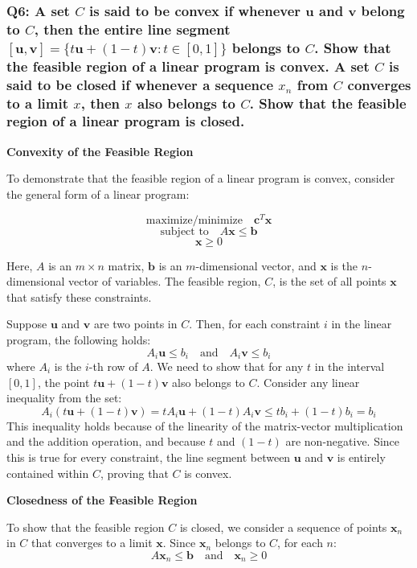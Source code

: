 \documentclass[8pt]{article}
\begin{document}
\subsubsection*{Q6: A set \(C\) is said to be convex if whenever \(\mathbf{u}\) and \(\mathbf{v}\) belong to \(C\), then the entire line segment \([\mathbf{u}, \mathbf{v}] = \{t \mathbf{u} + (1 - t) \mathbf{v} : t \in [0, 1]\}\) belongs to \(C\). Show that the feasible region of a linear program is convex. A set \(C\) is said to be closed if whenever a sequence \(x_n\) from \(C\) converges to a limit \(x\), then \(x\) also belongs to \(C\). Show that the feasible region of a linear program is closed.}

\textbf{Convexity of the Feasible Region}

To demonstrate that the feasible region of a linear program is convex, consider the general form of a linear program:

\[
\text{maximize/minimize} \quad \mathbf{c}^T \mathbf{x}
\]
\[
\text{subject to} \quad A\mathbf{x} \leq \mathbf{b}
\]
\[
\mathbf{x} \geq 0
\]

Here, \( A \) is an \( m \times n \) matrix, \( \mathbf{b} \) is an \( m \)-dimensional vector, and \( \mathbf{x} \) is the \( n \)-dimensional vector of variables. The feasible region, \( C \), is the set of all points \( \mathbf{x} \) that satisfy these constraints.

Suppose \( \mathbf{u} \) and \( \mathbf{v} \) are two points in \( C \). Then, for each constraint \( i \) in the linear program, the following holds:
\[
A_i \mathbf{u} \leq b_i \quad \text{and} \quad A_i \mathbf{v} \leq b_i
\]
where \( A_i \) is the \( i \)-th row of \( A \). We need to show that for any \( t \) in the interval \([0, 1]\), the point \( t \mathbf{u} + (1 - t) \mathbf{v} \) also belongs to \( C \). Consider any linear inequality from the set:
\[
A_i (t \mathbf{u} + (1 - t) \mathbf{v}) = t A_i \mathbf{u} + (1 - t) A_i \mathbf{v} \leq t b_i + (1 - t) b_i = b_i
\]
This inequality holds because of the linearity of the matrix-vector multiplication and the addition operation, and because \( t \) and \( (1 - t) \) are non-negative. Since this is true for every constraint, the line segment between \( \mathbf{u} \) and \( \mathbf{v} \) is entirely contained within \( C \), proving that \( C \) is convex.

\textbf{Closedness of the Feasible Region}

To show that the feasible region \( C \) is closed, we consider a sequence of points \( \mathbf{x}_n \) in \( C \) that converges to a limit \( \mathbf{x} \). Since \( \mathbf{x}_n \) belongs to \( C \), for each \( n \):
\[
A \mathbf{x}_n \leq \mathbf{b} \quad \text{and} \quad \mathbf{x}_n \geq 0
\]
\end{document}
